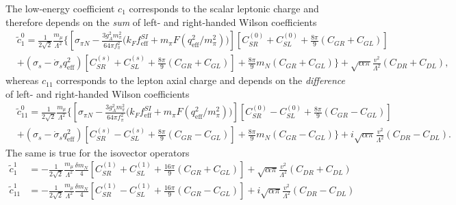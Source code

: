 \documentclass{book}[letterpaper,12pt]
\begin{document}
The low-energy coefficient $c_1$ corresponds to the scalar leptonic charge and therefore depends on the \textit{sum} of left- and right-handed Wilson coefficients
\begin{equation}
\begin{split}
&\tilde{c}_1^0=\frac{1}{2\sqrt{2}}\frac{m_{\mu}}{\Lambda^2}\bigg\{\left[\sigma_{\pi N}-\frac{3g_A^2m_{\pi}^2}{64\pi f_{\pi}^2}\Big(k_Ff_\mathrm{eff}^{SI}+m_{\pi}F\left(q_\mathrm{eff}^2/m_{\pi}^2\right)\Big)\right]\left[C_{SR}^{(0)}+C_{SL}^{(0)}+\frac{8\pi}{9}(C_{GR}+C_{GL})\right]\\
&+\left(\sigma_s-\dot{\sigma}_sq_\mathrm{eff}^2\right)\left[C_{SR}^{(s)}+C_{SL}^{(s)}+\frac{8\pi}{9}\left(C_{GR}+C_{GL}\right)\right]+\frac{8\pi}{9}m_N\left(C_{GR}+C_{GL}\right)\bigg\}+\sqrt{\alpha\pi}\frac{v^2}{\Lambda^2}\left(C_{DR}+C_{DL}\right),
\end{split}
\end{equation}
whereas $c_{11}$ corresponds to the lepton axial charge and depends on the \textit{difference} of left- and right-handed Wilson coefficients
\begin{equation}
\begin{split}
&\tilde{c}_{11}^0=\frac{1}{2\sqrt{2}}\frac{m_{\mu}}{\Lambda^2}\bigg\{\left[\sigma_{\pi N}-\frac{3g_A^2m_{\pi}^2}{64\pi f_{\pi}^2}\Big(k_Ff_\mathrm{eff}^{SI}+m_{\pi}F\left(q_\mathrm{eff}^2/m_{\pi}^2\right)\Big)\right]\left[C_{SR}^{(0)}-C_{SL}^{(0)}+\frac{8\pi}{9}(C_{GR}-C_{GL})\right]\\
&+\left(\sigma_s-\dot{\sigma}_sq_\mathrm{eff}^2\right)\left[C_{SR}^{(s)}-C_{SL}^{(s)}+\frac{8\pi}{9}\left(C_{GR}-C_{GL}\right)\right]+\frac{8\pi}{9}m_N\left(C_{GR}-C_{GL}\right)\bigg\}+i\sqrt{\alpha\pi}\frac{v^2}{\Lambda^2}\left(C_{DR}-C_{DL}\right).
\end{split}
\end{equation}
The same is true for the isovector operators
\begin{equation}
\begin{split}
\tilde{c}_1^1&=-\frac{1}{2\sqrt{2}}\frac{m_{\mu}}{\Lambda^2}\frac{\delta m_N}{4}\left[C_{SR}^{(1)}+C_{SL}^{(1)}+\frac{16\pi}{9}\left(C_{GR}+C_{GL}\right)\right]+\sqrt{\alpha\pi}\frac{v^2}{\Lambda^2}\left(C_{DR}+C_{DL}\right)\\
\tilde{c}_{11}^1&=-\frac{1}{2\sqrt{2}}\frac{m_{\mu}}{\Lambda^2}\frac{\delta m_N}{4}\left[C_{SR}^{(1)}-C_{SL}^{(1)}+\frac{16\pi}{9}\left(C_{GR}-C_{GL}\right)\right]+i\sqrt{\alpha\pi}\frac{v^2}{\Lambda^2}\left(C_{DR}-C_{DL}\right)
\end{split}
\end{equation}
\end{document}
